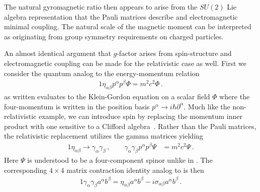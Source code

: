 The natural gyromagnetic ratio then appears to arise from the $SU(2)$ Lie algebra representation that the Pauli matrices describe and electromagnetic minimal coupling. The natural scale of the magnetic moment can be interpreted as originating from group symmetry requirements on charged particles.

An almost identical argument that $g$-factor arises from spin-structure and electromagnetic coupling can be made for the relativistic case as well. First we consider the quantum analog to the energy-momentum relation
\begin{alignat}{1}
	\label{analog:1} \eta_{\alpha\beta}p^{\alpha}p^{\beta}\Phi=m^{2}c^{2}\Phi\,.
\end{alignat}
 as written evaluates to the Klein-Gordon equation on a scalar field $\Phi$ where the four-momentum is written in the position basis $p^{\alpha}\rightarrow i\hbar\partial^{\alpha}$. Much like the non-relativistic example, we can introduce spin by replacing the momentum inner product with one sensitive to a Clifford algebra~\citep{Weinberg:1995mt}. Rather than the Pauli matrices, the relativistic replacement utilizes the gamma matrices yielding
\begin{alignat}{1}
	\label{eq:spin:03}
    \eta_{\alpha\beta}\rightarrow\gamma_{\alpha}\gamma_{\beta}\,,\qquad
    \gamma_{\alpha}\gamma_{\beta}p^{\alpha}p^{\beta}\Psi&=m^{2}c^{2}\Psi\,.
\end{alignat}
Here $\Psi$ is understood to be a four-component spinor unlike in . The corresponding $4\times4$ matrix contraction identity analog to  is then
\begin{alignat}{1}
	\label{eq:spin:04} \gamma_{\alpha}\gamma_{\beta}a^{\alpha}b^{\beta}=\eta_{\alpha\beta}a^{\alpha}b^{\beta}-i\sigma_{\alpha\beta}a^{\alpha}b^{\beta}\,.
\end{alignat}


